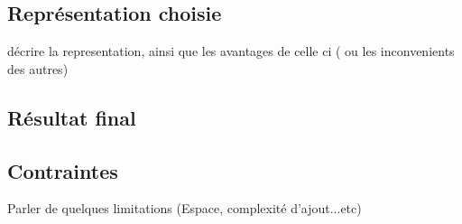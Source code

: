 	\subsection{Représentation choisie}
	décrire la representation, ainsi que les avantages de celle ci ( ou les inconvenients des autres)
	\subsection{Résultat final}
	\subsection{Contraintes}
	Parler de quelques limitations (Espace, complexité d'ajout...etc)

				